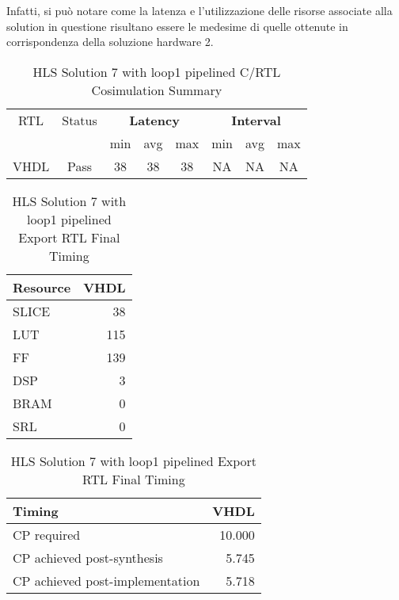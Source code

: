 Infatti, si può notare come la latenza e l'utilizzazione delle risorse associate alla solution in questione risultano essere le medesime di quelle ottenute in corrispondenza della soluzione hardware 2.

\begin{table}[H]
	\centering
	\begin{tabular}{|c|c|c|c|c|c|c|c|}
		\hline
		\multicolumn{1}{|c|}{RTL} & \multicolumn{1}{|c|}{Status} & \multicolumn{3}{c|}{\textbf{Latency}} & \multicolumn{3}{c|}{\textbf{Interval}} \\
		&  & min & avg & max & min & avg & max \\
		\hline
		VHDL & Pass & 38 & 38 & 38 & NA & NA & NA \\
		\hline
	\end{tabular}
	\caption{HLS Solution 7 with loop1 pipelined C/RTL Cosimulation Summary }
	\label{tab:hls-solution-7-loop1-pipeline-cosimulation-summary}
\end{table}

\begin{table}[H]
	\centering
	\begin{minipage}[t]{0.45\linewidth}
		\centering
		\begin{tabular}{|l|r|}
			\hline
			\textbf{Resource} & \textbf{VHDL} \\
			\hline
			SLICE & 38 \\
			\hline
			LUT & 115 \\
			\hline
			FF & 139 \\
			\hline
			DSP & 3 \\
			\hline
			BRAM & 0 \\
			\hline
			SRL & 0 \\
			\hline
		\end{tabular}
		\caption{HLS Solution 7 with loop1 pipelined Export RTL Resource Usage}
		\label{tab:hls-solution-7-loop1-pipeline-export-rtl-resoruce-usage}
	\end{minipage}
	\hfill
	\begin{minipage}[t]{0.45\linewidth}
		\centering
		\begin{tabular}{|l|r|}
			\hline
			\textbf{Timing} & \textbf{VHDL} \\
			\hline
			CP required & 10.000 \\
			\hline
			CP achieved post-synthesis & 5.745 \\
			\hline
			CP achieved post-implementation & 5.718 \\
			\hline
		\end{tabular}
		\caption{HLS Solution 7 with loop1 pipelined Export RTL Final Timing}
		\label{tab:hls-solution-7-loop1-pipeline-export-rtl-final-timing}
	\end{minipage}
\end{table}

